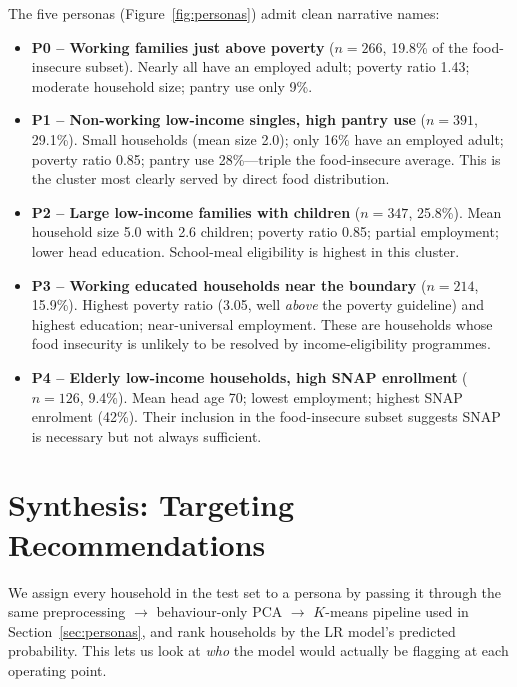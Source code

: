 \documentclass[10pt,letterpaper]{article}
\begin{document}
The five personas (Figure~\ref{fig:personas}) admit clean narrative
names:

\begin{itemize}
\item \textbf{P0 -- Working families just above poverty} ($n=266$, 19.8\% of the food-insecure subset).
       Nearly all have an employed adult; poverty ratio 1.43;
       moderate household size; pantry use only 9\%.
\item \textbf{P1 -- Non-working low-income singles, high pantry use} ($n=391$, 29.1\%).
       Small households (mean size 2.0); only 16\% have an employed
       adult; poverty ratio 0.85; pantry use 28\%---triple the food-insecure
       average.  This is the cluster most clearly served by direct food
       distribution.
\item \textbf{P2 -- Large low-income families with children} ($n=347$, 25.8\%).
       Mean household size 5.0 with 2.6 children; poverty ratio 0.85;
       partial employment; lower head education.  School-meal eligibility
       is highest in this cluster.
\item \textbf{P3 -- Working educated households near the boundary} ($n=214$, 15.9\%).
       Highest poverty ratio (3.05, well \emph{above} the poverty
       guideline) and highest education; near-universal employment.
       These are households whose food insecurity is unlikely to be
       resolved by income-eligibility programmes.
\item \textbf{P4 -- Elderly low-income households, high SNAP enrollment} ($n=126$, 9.4\%).
       Mean head age 70; lowest employment; highest SNAP enrolment
       (42\%).  Their inclusion in the food-insecure subset suggests
       SNAP is necessary but not always sufficient.
\end{itemize}

\section{Synthesis: Targeting Recommendations}
\label{sec:synth}

We assign every household in the test set to a persona by passing it
through the same preprocessing $\to$ behaviour-only PCA $\to$
$K$-means pipeline used in Section~\ref{sec:personas}, and rank
households by the LR model's predicted probability.  This lets us
look at \emph{who} the model would actually be flagging at each
operating point.
\end{document}
